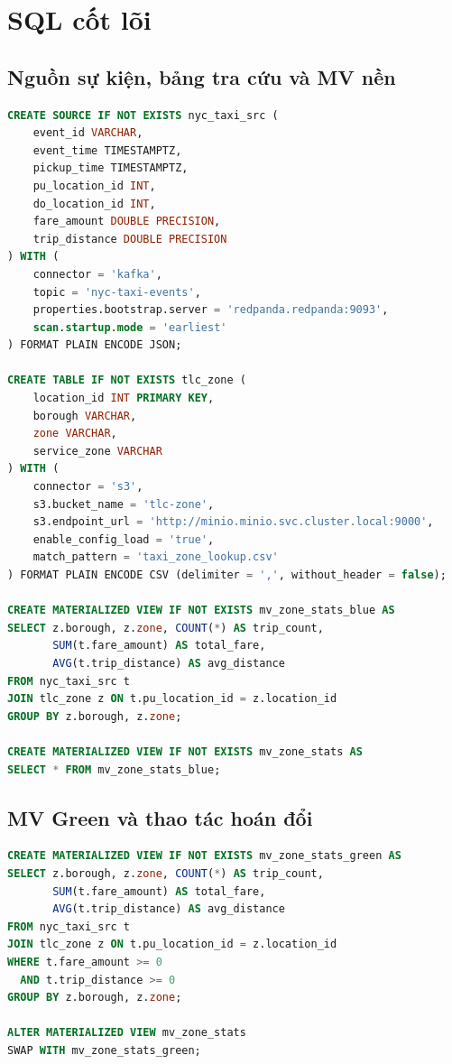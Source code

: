 \section{SQL cốt lõi}\label{app:core-sql}
\subsection{Nguồn sự kiện, bảng tra cứu và MV nền}
\begin{lstlisting}[language=SQL]
CREATE SOURCE IF NOT EXISTS nyc_taxi_src (
    event_id VARCHAR,
    event_time TIMESTAMPTZ,
    pickup_time TIMESTAMPTZ,
    pu_location_id INT,
    do_location_id INT,
    fare_amount DOUBLE PRECISION,
    trip_distance DOUBLE PRECISION
) WITH (
    connector = 'kafka',
    topic = 'nyc-taxi-events',
    properties.bootstrap.server = 'redpanda.redpanda:9093',
    scan.startup.mode = 'earliest'
) FORMAT PLAIN ENCODE JSON;

CREATE TABLE IF NOT EXISTS tlc_zone (
    location_id INT PRIMARY KEY,
    borough VARCHAR,
    zone VARCHAR,
    service_zone VARCHAR
) WITH (
    connector = 's3',
    s3.bucket_name = 'tlc-zone',
    s3.endpoint_url = 'http://minio.minio.svc.cluster.local:9000',
    enable_config_load = 'true',
    match_pattern = 'taxi_zone_lookup.csv'
) FORMAT PLAIN ENCODE CSV (delimiter = ',', without_header = false);

CREATE MATERIALIZED VIEW IF NOT EXISTS mv_zone_stats_blue AS
SELECT z.borough, z.zone, COUNT(*) AS trip_count,
       SUM(t.fare_amount) AS total_fare,
       AVG(t.trip_distance) AS avg_distance
FROM nyc_taxi_src t
JOIN tlc_zone z ON t.pu_location_id = z.location_id
GROUP BY z.borough, z.zone;

CREATE MATERIALIZED VIEW IF NOT EXISTS mv_zone_stats AS
SELECT * FROM mv_zone_stats_blue;
\end{lstlisting}

\subsection{MV Green và thao tác hoán đổi}
\begin{lstlisting}[language=SQL]
CREATE MATERIALIZED VIEW IF NOT EXISTS mv_zone_stats_green AS
SELECT z.borough, z.zone, COUNT(*) AS trip_count,
       SUM(t.fare_amount) AS total_fare,
       AVG(t.trip_distance) AS avg_distance
FROM nyc_taxi_src t
JOIN tlc_zone z ON t.pu_location_id = z.location_id
WHERE t.fare_amount >= 0
  AND t.trip_distance >= 0
GROUP BY z.borough, z.zone;

ALTER MATERIALIZED VIEW mv_zone_stats
SWAP WITH mv_zone_stats_green;
\end{lstlisting}

